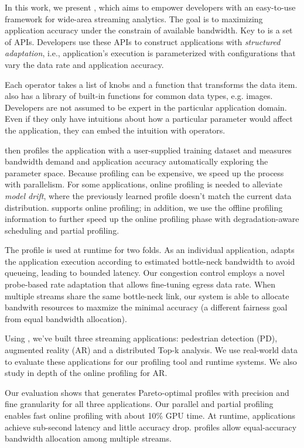 In this work, we present \sysname{}, which aims to empower developers with an
easy-to-use framework for wide-area streaming analytics. The goal is to
maximizing application accuracy under the constrain of available bandwidth. Key
to \sysname{} is a set of \maybe{} APIs. Developers use these APIs to construct
applications with \textit{structured adaptation}, i.e., application's execution
is parameterized with configurations that vary the data rate and application
accuracy.

Each \maybe{} operator takes a list of knobs and a function that transforms the
data item. \sysname{} also has a library of built-in functions for common data
types, e.g. images. Developers are not assumed to be expert in the particular
application domain. Even if they only have intuitions about how a particular
parameter would affect the application, they can embed the intuition with
\maybe{} operators.

\sysname{} then profiles the application with a user-supplied training dataset
and measures bandwidth demand and application accuracy automatically exploring
the parameter space. Because profiling can be expensive, we speed up the process
with parallelism. For some applications, online profiling is needed to alleviate
\textit{model drift}, where the previously learned profile doesn't match the
current data distribution. \sysname{} supports online profiling; in addition, we
use the offline profiling information to further speed up the online profiling
phase with degradation-aware scheduling and partial profiling.

The profile is used at runtime for two folds. As an individual application,
\sysname{} adapts the application execution according to estimated bottle-neck
bandwidth to avoid queueing, leading to bounded latency. Our congestion control
employs a novel probe-based rate adaptation that allows fine-tuning egress data
rate. When multiple streams share the same bottle-neck link, our system is able
to allocate bandwith resources to maxmize the minimal accuracy (a different
fairness goal from equal bandwidth allocation).

Using \sysname{}, we've built three streaming applications: pedestrian detection
(PD), augmented reality (AR) and a distributed Top-k analysis. We use real-world
data to evaluate these applications for our profiling tool and runtime
systems. We also study in depth of the online profiling for AR.

Our evaluation shows that \sysname{} generates Pareto-optimal profiles with
precision and fine granularity for all three applications. Our parallel and
partial profiling enables fast online profiling with about 10\% GPU time. At
runtime, \sysname{} applications achieve sub-second latency and little accuracy
drop. \sysname{} profiles allow equal-accuracy bandwidth allocation among
multiple streams.

